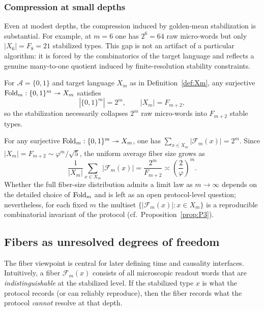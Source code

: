 \subsubsection{Compression at small depths}

Even at modest depths, the compression induced by golden-mean stabilization is substantial. For example, at $m=6$ one has $2^6=64$ raw micro-words but only $|X_6|=F_8=21$ stabilized types. This gap is not an artifact of a particular algorithm: it is forced by the combinatorics of the target language and reflects a genuine many-to-one quotient induced by finite-resolution stability constraints.

\begin{proposition}\label{prop:fold-count}
For $\mathcal{A}=\{0,1\}$ and target language $X_m$ as in Definition~\ref{def:Xm}, any surjective $\mathrm{Fold}_m : \{0,1\}^m \twoheadrightarrow X_m$ satisfies
\[
|\{0,1\}^m| = 2^m,\qquad |X_m| = F_{m+2},
\]
so the stabilization necessarily collapses $2^m$ raw micro-words into $F_{m+2}$ stable types.
\end{proposition}

\begin{remark}\label{rem:fiber-asymptotic}
For any surjective $\mathrm{Fold}_m:\{0,1\}^m\twoheadrightarrow X_m$, one has $\sum_{x\in X_m}|\mathcal{F}_m(x)|=2^m$. Since $|X_m|=F_{m+2}\sim \varphi^{m}/\sqrt5$, the uniform average fiber size grows as
\[
\frac{1}{|X_m|}\sum_{x\in X_m}|\mathcal{F}_m(x)|=\frac{2^m}{F_{m+2}} \asymp \left(\frac{2}{\varphi}\right)^m.
\]
Whether the full fiber-size distribution admits a limit law as $m\to\infty$ depends on the detailed choice of $\mathrm{Fold}_m$ and is left as an open protocol-level question; nevertheless, for each fixed $m$ the multiset $\{|\mathcal{F}_m(x)|:x\in X_m\}$ is a reproducible combinatorial invariant of the protocol (cf.\ Proposition~\ref{prop:P3}).
\end{remark}

\subsection{Fibers as unresolved degrees of freedom}\label{sec:stabilization:fibers}

The fiber viewpoint is central for later defining time and causality interfaces. Intuitively, a fiber $\mathcal{F}_m(x)$ consists of all microscopic readout words that are \emph{indistinguishable} at the stabilized level. If the stabilized type $x$ is what the protocol records (or can reliably reproduce), then the fiber records what the protocol \emph{cannot} resolve at that depth.

